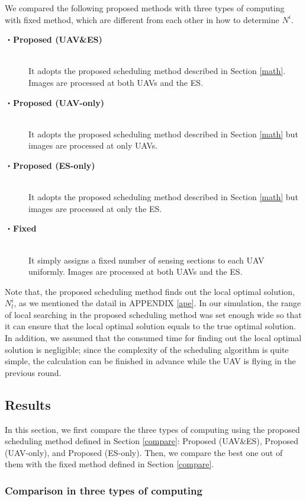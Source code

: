 \documentclass[journal]{IEEEtran}
\begin{document}
We compared the following proposed methods with three types of computing with fixed method, which are different from each other in how to determine $N^i$.
%
\begin{description}
\item[・{\bf Proposed (UAV\&ES)}] \mbox{} \\It adopts the proposed scheduling method described in Section \ref{math}. Images are processed at both UAVs and the ES.
\item[・{\bf Proposed (UAV-only)}]\mbox{} \\It adopts the proposed scheduling method described in Section \ref{math} but images are processed at only UAVs.
\item[・{\bf Proposed (ES-only)}] \mbox{} \\It adopts the proposed scheduling method described in Section \ref{math} but images are processed at only the ES.
\item[・{\bf Fixed}] \mbox{} \\It simply assigns a fixed number of sensing sections to each UAV uniformly. Images are processed at both UAVs and the ES.
\end{description}
%
Note that, the proposed scheduling method finds out the local optimal solution, $N_{l}^i$, as we mentioned the datail in APPENDIX \ref{ape}.
In our simulation, the range of local searching in the proposed scheduling method was set enough wide so that it can ensure that the local optimal solution equals to the true optimal solution.
%
In addition, we assumed that the consumed time for finding out the local optimal solution is negligible; since the complexity of the scheduling algorithm is quite simple, the calculation can be finished in advance while the UAV is flying in the previous round.

\subsection{Results}
In this section, we first compare the three types of computing using the proposed scheduling method defined in Section \ref{compare}: Proposed (UAV\&ES), Proposed (UAV-only), and Proposed (ES-only).
Then, we compare the best one out of them with the fixed method defined in Section \ref{compare}.

\subsubsection{Comparison in three types of computing}
\end{document}
